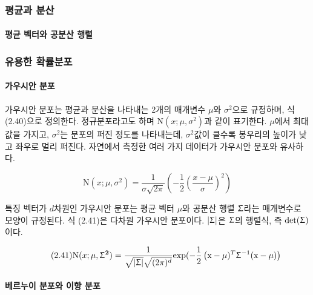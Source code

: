 \documentclass [12pt] {oblivoir}
\let\oldsubsubsection=\subsubsection
\renewcommand{\subsubsection}
{
  \filbreak
  \oldsubsubsection
}
\begin{document}
\subsubsection{평균과 분산}

\paragraph*{평균 벡터와 공분산 행렬}\mbox{}

\subsubsection{유용한 확률분포}

\paragraph*{가우시안 분포}\mbox{}

\vspace{3mm}
\;가우시안 분포는 평균과 분산을 나타내는 2개의 매개변수 $\mu$와 $\sigma^{2}$으로 규정하며,
식 (2.40)으로 정의한다. 정규분포라고도 하며 $\text{N}(x; \mu, \sigma^{2})$과 같이 표기한다. $\mu$에서 최대값을 가지고, $\sigma^{2}$는 분포의 퍼진 정도를 나타내는데,
$\sigma^{2}$값이 클수록 봉우리의 높이가 낮고 좌우로 멀리 퍼진다. 자연에서 측정한 여러 가지 데이터가 가우시안 분포와 유사하다.

\begin{equation} \tag{2.40}
  \text{N}(x; \mu, \sigma^{2}) = \frac{1}{\sigma\sqrt{2\pi}}\left(-\frac{1}{2}\left(\frac{x - \mu}{\sigma}\right)^{2}\right)
\end{equation}

\vspace{3mm}
\;특징 벡터가 $d$차원인 가우시안 분포는 평균 벡터 $\mu$와 공분산 행렬 $\mathbf{\Upsigma}$라는 매개변수로 모양이 규정된다. 식 (2.41)은 다차원 가우시안 분포이다.
$|\mathbf{\Upsigma}|$은 $\mathbf{\Upsigma}$의 행렬식, 즉 $\text{det}(\mathbf{\Upsigma})$이다.

\begin{equation} \tag{2.41}
  \text{N}(x; \mu, \mathbf{\Upsigma^{2}}) = \frac{1}{\sqrt{|\mathbf{\Upsigma}|}\sqrt{(2\pi)^{d}}}\text{exp}(-\frac{1}{2}\left(\mathbf{\text{x}} - \mathbf{\mu})^{T}\mathbf{\Upsigma}^{-1}(\mathbf{\text{x} - \mu})\right)
\end{equation}

\paragraph*{베르누이 분포와 이항 분포}\mbox{}
\end{document}
